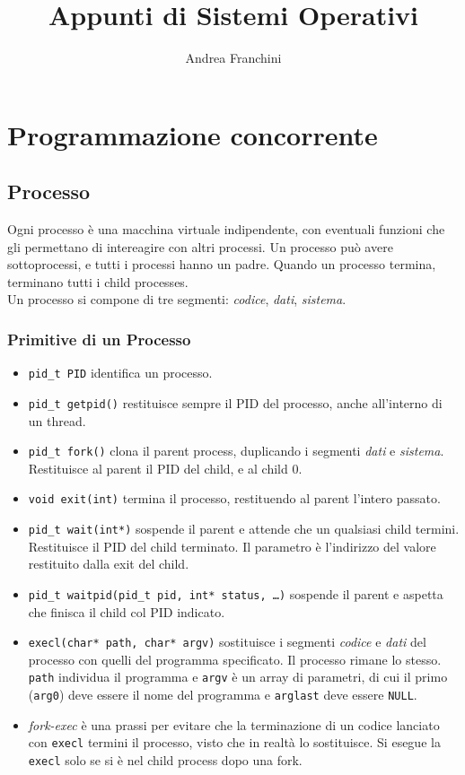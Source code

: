 \documentclass[10pt,a4paper]{article}
\author{Andrea Franchini}
\title{Appunti di Sistemi Operativi}
\newcommand{\code}{\texttt}
\begin{document}
    
\maketitle


\section{Programmazione concorrente}

\subsection{Processo} Ogni processo è una macchina virtuale indipendente, con eventuali funzioni che gli permettano di intereagire con altri processi. Un processo può avere sottoprocessi, e tutti i processi hanno un padre. Quando un processo termina, terminano tutti i child processes.\\
Un processo si compone di tre segmenti: \emph{codice}, \emph{dati}, \emph{sistema}.

\subsubsection{Primitive di un Processo}
\begin{itemize}
    \item \code{pid\_t PID} identifica un processo.
    \item \code{pid\_t getpid()} restituisce sempre il PID del processo, anche all'interno di un thread.
    \item \code{pid\_t fork()} clona il parent process, duplicando i segmenti \emph{dati} e \emph{sistema}. Restituisce al parent il PID del child, e al child 0.
    \item \code{void exit(int)} termina il processo, restituendo al parent l'intero passato.
    \item \code{pid\_t wait(int*)} sospende il parent e attende che un qualsiasi child termini. Restituisce il PID del child terminato. Il parametro è l'indirizzo del valore restituito dalla exit del child.
    \item \code{pid\_t waitpid(pid\_t pid, int* status, \dots)} sospende il parent e aspetta che finisca il child col PID indicato.
    \item \code{execl(char* path, char* argv)} sostituisce i segmenti \emph{codice} e \emph{dati} del processo con quelli del programma specificato. Il processo rimane lo stesso. \code{path} individua il programma e \code{argv} è un array di parametri, di cui il primo (\code{arg0}) deve essere il nome del programma e \code{arglast} deve essere \code{NULL}.
    \item \emph{fork-exec} è una prassi per evitare che la terminazione di un codice lanciato con \code{execl} termini il processo, visto che in realtà lo sostituisce. Si esegue la \code{execl} solo se si è nel child process dopo una fork.
\end{itemize}
\end{document}
